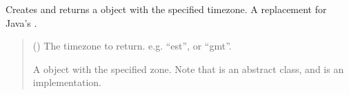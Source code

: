 \documentclass[letterpaper,10pt,english]{sphinxmanual}
\begin{document}
\begin{fulllineitems}
\label{\detokenize{apache_commons_validator_python.util:apache_commons_validator_python.util.datetime_helpers.timezone_gmt}}
\pysigstartsignatures
{}
\pysigstopsignatures
\sphinxAtStartPar
Creates and returns a  object with the specified timezone. A
replacement for Java’s .
\begin{quote}\begin{description}
\sphinxAtStartPar
{} () \textendash{} The timezone to return. e.g. “est”, or “gmt”.

\sphinxAtStartPar
A  object with the specified zone.
Note that  is an abstract class, and  is an implementation.

\end{description}\end{quote}

\end{fulllineitems}

\end{document}

